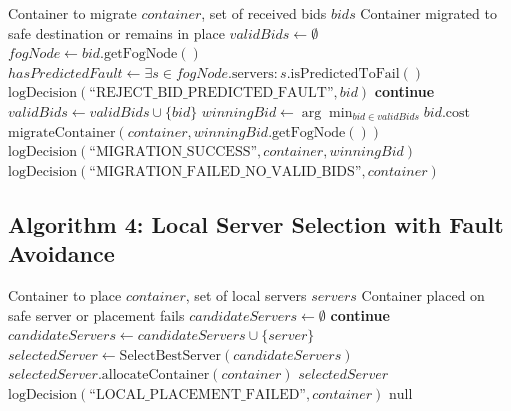 \documentclass[12pt,a4paper]{article}
\begin{document}
\begin{algorithm}[H]
\caption{Handle Migration Request with Fault Prevention}
\begin{algorithmic}[1]
\Require Container to migrate $container$, set of received bids $bids$
\Ensure Container migrated to safe destination or remains in place
\State $validBids \gets \emptyset$
    \State $fogNode \gets bid.\text{getFogNode}()$
    \State $hasPredictedFault \gets \exists s \in fogNode.\text{servers} : s.\text{isPredictedToFail}()$
        \State $\text{logDecision}(\text{``REJECT\_BID\_PREDICTED\_FAULT''}, bid)$
        \State \textbf{continue} 
    \EndIf
        \State $validBids \gets validBids \cup \{bid\}$
    \EndIf
\EndFor
{}
    \State $winningBid \gets \arg\min_{bid \in validBids} bid.\text{cost}$
    \State $\text{migrateContainer}(container, winningBid.\text{getFogNode}())$
    \State $\text{logDecision}(\text{``MIGRATION\_SUCCESS''}, container, winningBid)$
\Else
    \State $\text{logDecision}(\text{``MIGRATION\_FAILED\_NO\_VALID\_BIDS''}, container)$
\EndIf
\end{algorithmic}
\end{algorithm}

\subsection{Algorithm 4: Local Server Selection with Fault Avoidance}

\begin{algorithm}[H]
\caption{Select Local Server for Container Placement}
\begin{algorithmic}[1]
\Require Container to place $container$, set of local servers $servers$
\Ensure Container placed on safe server or placement fails
\State $candidateServers \gets \emptyset$
        \State \textbf{continue} 
    \EndIf
        \State $candidateServers \gets candidateServers \cup \{server\}$
    \EndIf
\EndFor
{}
    \State $selectedServer \gets \text{SelectBestServer}(candidateServers)$ 
    \State $selectedServer.\text{allocateContainer}(container)$
    \State \Return $selectedServer$
\Else
    \State $\text{logDecision}(\text{``LOCAL\_PLACEMENT\_FAILED''}, container)$
    \State \Return $\text{null}$
\EndIf
\end{algorithmic}
\end{algorithm}
\end{document}
